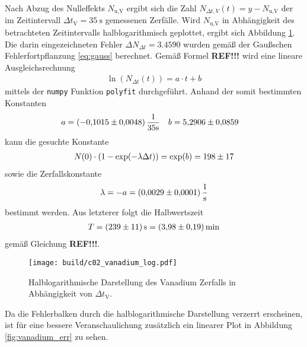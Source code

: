 \noindent
Nach Abzug des Nulleffekts $N_\text{u,V}$ ergibt sich die Zahl $N_{\Delta t,V}(t) = y- N_\text{u,V}$ der im Zeitintervall $\Delta t_\text{V} = \qty[]{35}{\second}$
gemessenen Zerfälle.
Wird $N_\text{u,V}$ in Abhängigkeit des betrachteten Zeitintervalls halblogarithmisch geplottet, ergibt sich Abbildung \ref{fig:vanadium_log}.
Die darin eingezeichneten Fehler $\Delta N_{\Delta t} = \num[]{3.4590}$ wurden gemäß der Gaußschen Fehlerfortpflanzung \eqref{eq:gauss} berechnet.
Gemäß Formel \textbf{REF!!!} wird eine lineare Ausgleichsrechnung 
\begin{align}
    \ln\left(N_{\Delta t}(t)\right) = a \cdot t + b
    \label{eq:linear_eq}
\end{align}
mittels der \texttt{numpy} \cite[]{numpy} Funktion \texttt{polyfit} durchgeführt.
Anhand der somit bestimmten Konstanten
\begin{align*}
    a &= (\num{-0.1015 +- 0.0048}) \, \frac{1}{35 \unit{\second}}  & b &= \num{5.2906 +- 0.0859}
\end{align*}
kann die gesuchte Konstante 
\begin{align}
    N(0) \cdot \left(1- \exp(- \lambda \Delta t)\right) = \exp(b) = \num[]{198 +- 17}
\end{align}
sowie die Zerfallskonstante 
\begin{align}
    \lambda = - a = \qty[]{0.0029+-0.0001}{\per\second}
\end{align}
bestimmt werden.
Aus letzterer folgt die Halbwertszeit 
\begin{align}
    T = \qty[]{239 +- 11}{\second} = \qty[]{3.98 +- 0.19}{\minute}
\end{align}
gemäß Gleichung \textbf{REF!!!}.

\begin{figure}[H]
    \centering
    \texttt{[image: build/c02\_vanadium\_log.pdf]}
    \caption[]{Halblogarithmische Darstellung des Vanadium Zerfalls in Abhängigkeit von $\Delta t_\text{V}$.}
    \label{fig:vanadium_log}
\end{figure}

\noindent
Da die Fehlerbalken durch die halblogarithmische Darstellung verzerrt erscheinen, ist für eine bessere Veranschaulichung zusätzlich ein linearer
Plot in Abbildung \ref{fig:vanadium_err} zu sehen.

